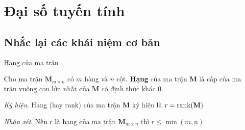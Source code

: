 \chapter{Đại số tuyến tính}

\section{Nhắc lại các khái niệm cơ bản}

\begin{defblock}{Hạng của ma trận}
    
    Cho ma trận $\mathbf{M}_{m \times n}$ có $m$ hàng và $n$ cột. \textbf{Hạng} của ma trận $\mathbf{M}$ là cấp của ma trận vuông con lớn nhất của $\mathbf{M}$ có định thức khác 0.

    \textit{Ký hiệu}. Hạng (hay rank) của ma trận $\mathbf{M}$ ký hiệu là $r = \text{rank}(\mathbf{M})$

    \textit{Nhận xét}. Nếu $r$ là hạng của ma trận $\mathbf{M}_{m \times n}$ thì $r \leq \min (m, n)$
\end{defblock}

\newpage